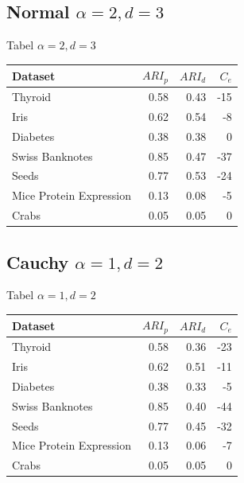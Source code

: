 \documentclass[ignorenonframetext,]{beamer}
\begin{document}
\subsection{\texorpdfstring{Normal
\(\alpha = 2, d = 3\)}{Normal \textbackslash{}alpha = 2, d = 3}}\label{normal-alpha-2-d-3}

\begin{frame}{Tabel \(\alpha = 2, d = 3\)}

\begin{center}


\begin{tabular}{l|r|r|r}
\hline
Dataset & ${ARI}_p$ & ${ARI}_d$ & $C_e$\\
\hline
Thyroid & 0.58 & 0.43 & -15\\
\hline
Iris & 0.62 & 0.54 & -8\\
\hline
Diabetes & 0.38 & 0.38 & 0\\
\hline
Swiss Banknotes & 0.85 & 0.47 & -37\\
\hline
Seeds & 0.77 & 0.53 & -24\\
\hline
Mice Protein Expression & 0.13 & 0.08 & -5\\
\hline
Crabs & 0.05 & 0.05 & 0\\
\hline
\end{tabular}

\end{center}

\end{frame}

\subsection{\texorpdfstring{Cauchy
\(\alpha = 1, d = 2\)}{Cauchy \textbackslash{}alpha = 1, d = 2}}\label{cauchy-alpha-1-d-2}

\begin{frame}{Tabel \(\alpha = 1, d = 2\)}

\begin{center}


\begin{tabular}{l|r|r|r}
\hline
Dataset & ${ARI}_p$ & ${ARI}_d$ & $C_e$\\
\hline
Thyroid & 0.58 & 0.36 & -23\\
\hline
Iris & 0.62 & 0.51 & -11\\
\hline
Diabetes & 0.38 & 0.33 & -5\\
\hline
Swiss Banknotes & 0.85 & 0.40 & -44\\
\hline
Seeds & 0.77 & 0.45 & -32\\
\hline
Mice Protein Expression & 0.13 & 0.06 & -7\\
\hline
Crabs & 0.05 & 0.05 & 0\\
\hline
\end{tabular}

\end{center}

\end{frame}
\end{document}
